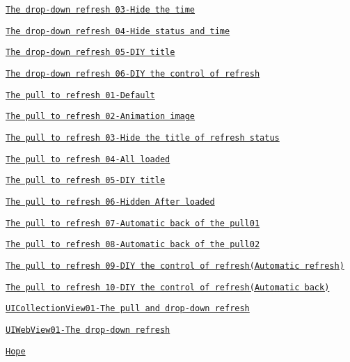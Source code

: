 \begin{DoxyItemize}
\begin{DoxyItemize}
\item \href{#The drop-down refresh 03-Hide the time}{\tt The drop-\/down refresh 03-\/\+Hide the time}
\item \href{#The drop-down refresh 04-Hide status and time}{\tt The drop-\/down refresh 04-\/\+Hide status and time}
\item \href{#The drop-down refresh 05-DIY title}{\tt The drop-\/down refresh 05-\/\+D\+IY title}
\item \href{#The drop-down refresh 06-DIY the control of refresh}{\tt The drop-\/down refresh 06-\/\+D\+IY the control of refresh}
\item \href{#The pull to refresh 01-Default}{\tt The pull to refresh 01-\/\+Default}
\item \href{#The pull to refresh 02-Animation image}{\tt The pull to refresh 02-\/\+Animation image}
\item \href{#The pull to refresh 03-Hide the title of refresh status}{\tt The pull to refresh 03-\/\+Hide the title of refresh status}
\item \href{#The pull to refresh 04-All loaded}{\tt The pull to refresh 04-\/\+All loaded}
\item \href{#The pull to refresh 05-DIY title}{\tt The pull to refresh 05-\/\+D\+IY title}
\item \href{#The pull to refresh 06-Hidden After loaded}{\tt The pull to refresh 06-\/\+Hidden After loaded}
\item \href{#上The pull to refresh 07-Automatic back of the pull01}{\tt The pull to refresh 07-\/\+Automatic back of the pull01}
\item \href{#The pull to refresh 08-Automatic back of the pull02}{\tt The pull to refresh 08-\/\+Automatic back of the pull02}
\item \href{#The pull to refresh 09-DIY the control of refresh(Automatic refresh)}{\tt The pull to refresh 09-\/\+D\+IY the control of refresh(\+Automatic refresh)}
\item \href{#The pull to refresh 10-DIY the control of refresh(Automatic back)}{\tt The pull to refresh 10-\/\+D\+IY the control of refresh(\+Automatic back)}
\item \href{#UICollectionView01-The pull and drop-down refresh}{\tt U\+I\+Collection\+View01-\/\+The pull and drop-\/down refresh}
\item \href{#UIWebView01-The drop-down refresh}{\tt U\+I\+Web\+View01-\/\+The drop-\/down refresh}
\end{DoxyItemize}
\item \href{#Hope}{\tt Hope}
\end{DoxyItemize}

